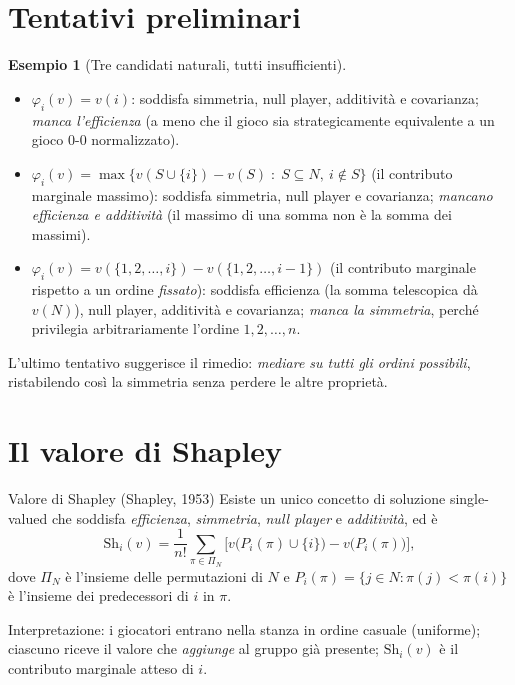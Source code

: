 \documentclass[12pt,a4paper,twoside]{book}
\theoremstyle{plain}
\theoremstyle{definition}
\newtheorem{example}[theorem]{Esempio}
\newcommand{\Sh}{\mathrm{Sh}}
\begin{document}
\section{Tentativi preliminari}

\begin{example}[Tre candidati naturali, tutti insufficienti]
\begin{itemize}
  \item $\varphi_i(v)=v(i)$: soddisfa simmetria, null player, additività e
        covarianza; \emph{manca l'efficienza} (a meno che il gioco sia
        strategicamente equivalente a un gioco $0$-$0$ normalizzato).
  \item $\varphi_i(v)=\max\{v(S\cup\{i\})-v(S)\;:\;S\subseteq N,\ i\notin S\}$
        (il contributo marginale massimo): soddisfa simmetria, null player e
        covarianza; \emph{mancano efficienza e additività} (il massimo di una
        somma non è la somma dei massimi).
  \item $\varphi_i(v)=v(\{1,2,\dots,i\})-v(\{1,2,\dots,i-1\})$ (il contributo
        marginale rispetto a un ordine \emph{fissato}): soddisfa efficienza (la
        somma telescopica dà $v(N)$), null player, additività e covarianza;
        \emph{manca la simmetria}, perché privilegia arbitrariamente l'ordine
        $1,2,\dots,n$.
\end{itemize}
\end{example}

L'ultimo tentativo suggerisce il rimedio: \emph{mediare su tutti gli ordini
possibili}, ristabilendo così la simmetria senza perdere le altre proprietà.

\section{Il valore di Shapley}

\begin{thmbox}{Valore di Shapley (Shapley, 1953)}
Esiste un unico concetto di soluzione single-valued che soddisfa
\emph{efficienza}, \emph{simmetria}, \emph{null player} e \emph{additività},
ed è
\[
  \Sh_i(v)=\frac{1}{n!}\sum_{\pi\in\Pi_N}\bigl[v\bigl(P_i(\pi)\cup\{i\}\bigr)-v\bigl(P_i(\pi)\bigr)\bigr],
\]
dove $\Pi_N$ è l'insieme delle permutazioni di $N$ e
$P_i(\pi)=\{j\in N:\pi(j)<\pi(i)\}$ è l'insieme dei predecessori di $i$ in $\pi$.
\end{thmbox}

Interpretazione: i giocatori entrano nella stanza in ordine casuale (uniforme);
ciascuno riceve il valore che \emph{aggiunge} al gruppo già presente; $\Sh_i(v)$
è il contributo marginale atteso di $i$.
\end{document}
